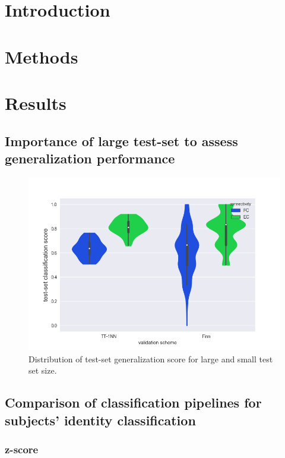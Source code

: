 \documentclass[12pt, a4paper, final, fleqn]{article}
\begin{document}
\newpage
\tableofcontents
\newpage
\section{Introduction}
\label{intro}



\section{Methods}
\label{methods}

\section{Results}
\label{results}

\subsection{Importance of large test-set to assess generalization performance}
\begin{figure}[!htb]
\begin{center}
\includegraphics[width=0.89\columnwidth]{variability_finn_1nn_violins_hues}
  \caption[Variability of generalization score]{Distribution of test-set generalization score for large and small test set size.
	  \label{fig:variability_score}}
\end{center}
\end{figure}

\subsection{Comparison of classification pipelines for subjects' identity classification}
\subsubsection{z-score}
\end{document}
